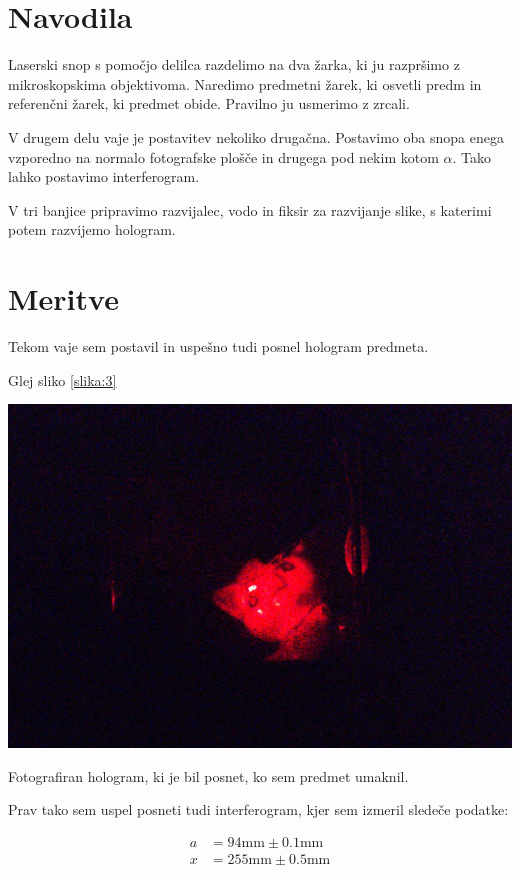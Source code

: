 \documentclass[11pt]{article}
\renewcommand{%
  \refname}{Viri}
\begin{document}
\section{Navodila}\label{sec:org9ab1b67}

Laserski snop s pomočjo delilca razdelimo na dva žarka, ki ju razpršimo z mikroskopskima objektivoma. Naredimo predmetni žarek, ki osvetli predm in referenčni žarek, ki predmet obide. Pravilno ju usmerimo z zrcali.

V drugem delu vaje je postavitev nekoliko drugačna. Postavimo oba snopa enega vzporedno na normalo fotografske plošče in drugega pod nekim kotom \(\alpha\). Tako lahko postavimo interferogram.

V tri banjice pripravimo razvijalec, vodo in fiksir za razvijanje slike, s katerimi potem razvijemo hologram.
\section{Meritve}\label{sec:org1bd5112}

Tekom vaje sem postavil in uspešno tudi posnel hologram predmeta.

Glej sliko \ref{slika:3}

\begin{slika}[H]
\begin{center}
\includegraphics[width=.9\linewidth]{20241015_131245(1).jpg}
\end{center}
\caption{\small Fotografiran hologram, ki je bil posnet, ko sem predmet umaknil.}\label{slika:3}
\end{slika}

Prav tako sem uspel posneti tudi interferogram, kjer sem izmeril sledeče podatke:

\begin{align*}
a &= 94 \mathrm{mm} \pm 0.1 \mathrm{mm} \\
x &= 255 \mathrm{mm} \pm 0.5 \mathrm{mm}
\end{align*}
\end{document}
